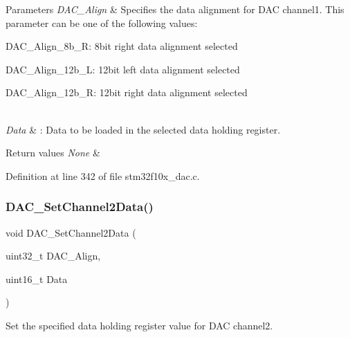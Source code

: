\begin{DoxyParams}{Parameters}
{\em D\+A\+C\+\_\+\+Align} & Specifies the data alignment for D\+AC channel1. This parameter can be one of the following values\+: \begin{DoxyItemize}
\item D\+A\+C\+\_\+\+Align\+\_\+8b\+\_\+R\+: 8bit right data alignment selected \item D\+A\+C\+\_\+\+Align\+\_\+12b\+\_\+L\+: 12bit left data alignment selected \item D\+A\+C\+\_\+\+Align\+\_\+12b\+\_\+R\+: 12bit right data alignment selected \end{DoxyItemize}
\\
\hline
{\em Data} & \+: Data to be loaded in the selected data holding register. \\
\hline
\end{DoxyParams}

\begin{DoxyRetVals}{Return values}
{\em None} & \\
\hline
\end{DoxyRetVals}


Definition at line 342 of file stm32f10x\+\_\+dac.\+c.

\mbox{\label{group___d_a_c___private___functions_ga44e12006ec186791378d132da8541552}} 
\subsubsection{\texorpdfstring{D\+A\+C\+\_\+\+Set\+Channel2\+Data()}{DAC\_SetChannel2Data()}}
{\footnotesize\ttfamily void D\+A\+C\+\_\+\+Set\+Channel2\+Data (\begin{DoxyParamCaption}\item[{uint32\+\_\+t}]{D\+A\+C\+\_\+\+Align,  }\item[{uint16\+\_\+t}]{Data }\end{DoxyParamCaption})}



Set the specified data holding register value for D\+AC channel2. 


